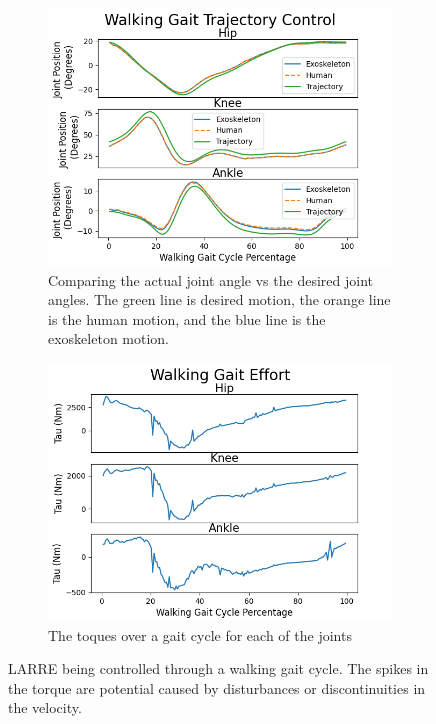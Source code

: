  
 \begin{figure}[h!]
    \begin{subfigure}{0.5\textwidth}
        \centering
        \captionsetup{width=.8\linewidth}%
        \includegraphics[width=0.9\linewidth]{images/sim/walkjoints.png}
        \caption{Comparing the actual joint angle vs the desired joint angles. The green line is desired motion, the orange line is the human motion, and the blue line is the exoskeleton motion.}
        \label{fig:simwalkingTraj}
    \end{subfigure}
    \begin{subfigure}{0.5\textwidth}
        \centering
        \captionsetup{width=.8\linewidth}%
        \includegraphics[width=0.9\linewidth]{images/sim/walktau.png}
        \caption{The toques over a gait cycle for each of the joints}
    \label{fig:simwalkingtorque}
\end{subfigure}
    \caption[LARRE Simulation Gait Kinematics]{LARRE being controlled through a walking gait cycle. The spikes in the torque are potential caused by disturbances or discontinuities in the velocity. }
    \label{fig:simwalking}
\end{figure}
 
